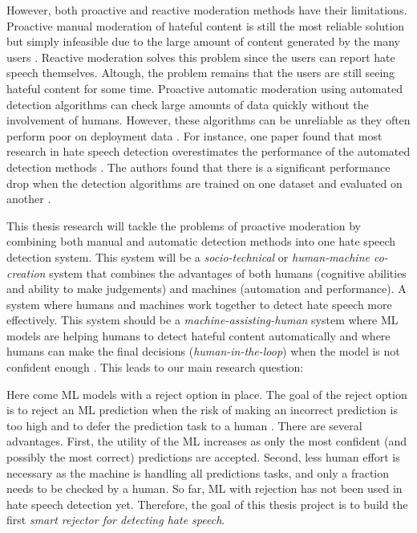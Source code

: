 However, both proactive and reactive moderation methods have their limitations. Proactive manual moderation of hateful content is still the most reliable solution but simply infeasible due to the large amount of content generated by the many users \cite{balayn2021automatic}. Reactive moderation solves this problem since the users can report hate speech themselves. Altough, the problem remains that the users are still seeing hateful content for some time. Proactive automatic moderation using automated detection algorithms can check large amounts of data quickly without the involvement of humans. However, these algorithms can be unreliable as they often perform poor on deployment data \cite{balayn2021automatic}. For instance, one paper found that most research in hate speech detection overestimates the performance of the automated detection methods \cite{arango2019hate}. The authors found that there is a significant performance drop when the detection algorithms are trained on one dataset and evaluated on another \cite{arango2019hate}.

This thesis research will tackle the problems of proactive moderation by combining both manual and automatic detection methods into one hate speech detection system. This system will be a \textit{socio-technical} or \textit{human-machine co-creation} \cite{woo2020future} system that combines the advantages of both humans (cognitive abilities and ability to make judgements) and machines (automation and performance). A system where humans and machines work together to detect hate speech more effectively. This system should be a \textit{machine-assisting-human} system where ML models are helping humans to detect hateful content automatically and where humans can make the final decisions (\textit{human-in-the-loop}) when the model is not confident enough \cite{woo2020future}. This leads to our main research question:


Here come ML models with a reject option in place. The goal of the reject option is to reject an ML prediction when the risk of making an incorrect prediction is too high and to defer the prediction task to a human \cite{hendrickx2021machine}. There are several advantages. First, the utility of the ML increases as only the most confident (and possibly the most correct) predictions are accepted. Second, less human effort is necessary as the machine is handling all predictions tasks, and only a fraction needs to be checked by a human. So far, ML with rejection has not been used in hate speech detection yet. Therefore, the goal of this thesis project is to build the first \textit{smart rejector for detecting hate speech}. 

